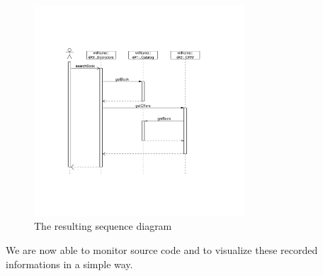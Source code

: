 	\begin{figure}[H]
	  \begin{center}
	    \includegraphics[width=0.7\textwidth]{sequenceDiagram.pdf}
            \caption{The resulting sequence diagram}
	    \label{image:sequencediagram}
	  \end{center}
	\end{figure}
	We are now able to monitor source code and to visualize these recorded informations in a simple way.

